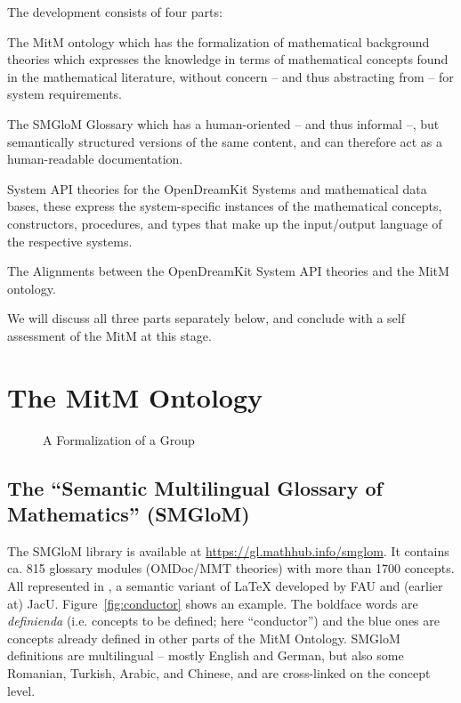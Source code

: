 \documentclass{deliverablereport}
\begin{document}
The development consists of four parts:
\begin{compactenum}[\em i\rm)]
\item The MitM ontology which has the formalization of mathematical background theories
  which expresses the knowledge in terms of mathematical concepts found in the
  mathematical literature, without concern -- and thus abstracting from -- for system
  requirements.
\item The SMGloM Glossary which has a human-oriented -- and thus informal --, but
  semantically structured versions of the same content, and can therefore act as a
  human-readable documentation.
\item System API theories for the OpenDreamKit Systems and mathematical data bases, these
  express the system-specific instances of the mathematical concepts, constructors,
  procedures, and types that make up the input/output language of the respective systems.
\item The Alignments between the OpenDreamKit System API theories and the MitM ontology. 
\end{compactenum}
We will discuss all three parts separately below, and conclude with a
self assessment of the MitM at this stage.

\section{The MitM Ontology}\label{sec:mitmonto}


\begin{figure}[ht]\centering
  \caption{A Formalization of a Group}\label{fig:mitm1}
\end{figure}

\subsection{The ``Semantic Multilingual Glossary of Mathematics'' (SMGloM)}\label{sec:smglom}

The SMGloM library is available at \url{https://gl.mathhub.info/smglom}. It contains
ca. 815 glossary modules (OMDoc/MMT theories) with more than 1700 concepts. All
represented in \sTeX, a semantic variant of {\LaTeX} developed by FAU and (earlier at)
JacU. Figure~\ref{fig:conductor} shows an example. The boldface words are \emph{definienda}
(i.e. concepts to be defined; here ``conductor'') and the blue ones are concepts already
defined in other parts of the MitM Ontology. SMGloM definitions are multilingual -- mostly
English and German, but also some Romanian, Turkish, Arabic, and Chinese, and are
cross-linked on the concept level.
\end{document}
